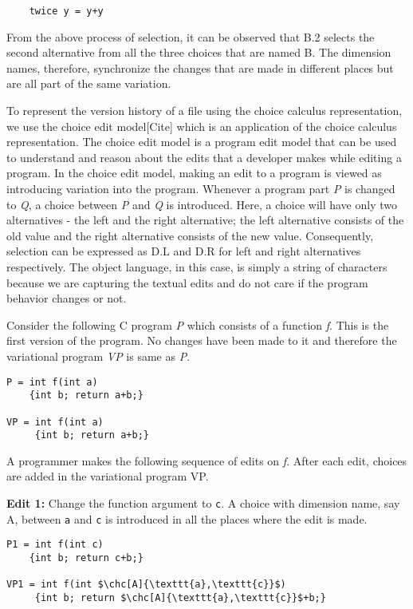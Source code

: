 \begin{lstlisting}
	twice y = y+y
\end{lstlisting}
        
From the above process of selection, it can be observed that B.2 selects the second alternative from all the three choices that are named B. The dimension names, therefore, synchronize the changes that are made in different places but are all part of the same variation. 

To represent the version history of a file using the choice calculus representation, we use the choice edit model[Cite] which is an application of the choice calculus representation. The choice edit model is a program edit model that can be used to understand and reason about the edits that a developer makes while editing a program. In the choice edit model, making an edit to a program is viewed as introducing variation into the program. Whenever a program part \textit{P} is changed to \textit{Q}, a choice between \textit{P} and \textit{Q} is introduced. Here, a choice will have only two alternatives - the left and the right alternative; the left alternative consists of the old value and the right alternative consists of the new value. Consequently, selection can be expressed as D.L and D.R for left and right alternatives respectively. The object language, in this case, is simply a string of characters because we are capturing the textual edits and do not care if the program behavior changes or not.

Consider the following C program \textit{P} which consists of a function \textit{f}. This is the first version of the program. No changes have been made to it and therefore the variational program \textit{VP} is same as \textit{P}.

\begin{lstlisting} 
P = int f(int a)
    {int b; return a+b;}
    
VP = int f(int a)
     {int b; return a+b;}
\end{lstlisting}

A programmer makes the following sequence of edits on \textit f. After each edit, choices are added in the variational program VP.

\textbf{Edit 1:} Change the function argument to \texttt{c}. A choice with dimension name, say A, between \texttt{a} and \texttt{c} is introduced in all the places where the edit is made.

\begin{lstlisting}
P1 = int f(int c)
    {int b; return c+b;}
    
VP1 = int f(int $\chc[A]{\texttt{a},\texttt{c}}$)
     {int b; return $\chc[A]{\texttt{a},\texttt{c}}$+b;}
\end{lstlisting}


